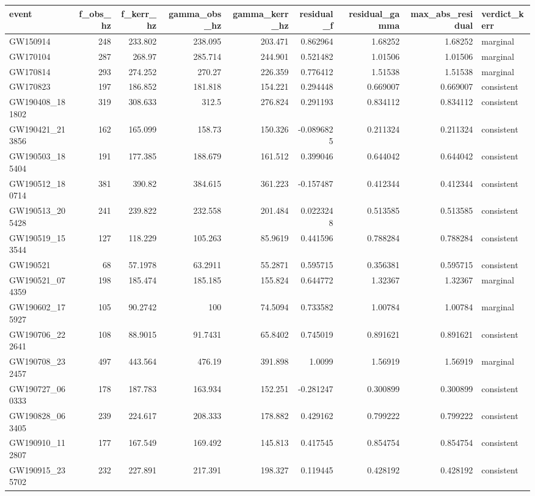 \begin{tabular}{lrrrrrrrl}
\toprule
event & f\_obs\_hz & f\_kerr\_hz & gamma\_obs\_hz & gamma\_kerr\_hz & residual\_f & residual\_gamma & max\_abs\_residual & verdict\_kerr \\
\midrule
GW150914 & 248 & 233.802 & 238.095 & 203.471 & 0.862964 & 1.68252 & 1.68252 & marginal \\
GW170104 & 287 & 268.97 & 285.714 & 244.901 & 0.521482 & 1.01506 & 1.01506 & marginal \\
GW170814 & 293 & 274.252 & 270.27 & 226.359 & 0.776412 & 1.51538 & 1.51538 & marginal \\
GW170823 & 197 & 186.852 & 181.818 & 154.221 & 0.294448 & 0.669007 & 0.669007 & consistent \\
GW190408\_181802 & 319 & 308.633 & 312.5 & 276.824 & 0.291193 & 0.834112 & 0.834112 & consistent \\
GW190421\_213856 & 162 & 165.099 & 158.73 & 150.326 & -0.0896825 & 0.211324 & 0.211324 & consistent \\
GW190503\_185404 & 191 & 177.385 & 188.679 & 161.512 & 0.399046 & 0.644042 & 0.644042 & consistent \\
GW190512\_180714 & 381 & 390.82 & 384.615 & 361.223 & -0.157487 & 0.412344 & 0.412344 & consistent \\
GW190513\_205428 & 241 & 239.822 & 232.558 & 201.484 & 0.0223248 & 0.513585 & 0.513585 & consistent \\
GW190519\_153544 & 127 & 118.229 & 105.263 & 85.9619 & 0.441596 & 0.788284 & 0.788284 & consistent \\
GW190521 & 68 & 57.1978 & 63.2911 & 55.2871 & 0.595715 & 0.356381 & 0.595715 & consistent \\
GW190521\_074359 & 198 & 185.474 & 185.185 & 155.824 & 0.644772 & 1.32367 & 1.32367 & marginal \\
GW190602\_175927 & 105 & 90.2742 & 100 & 74.5094 & 0.733582 & 1.00784 & 1.00784 & marginal \\
GW190706\_222641 & 108 & 88.9015 & 91.7431 & 65.8402 & 0.745019 & 0.891621 & 0.891621 & consistent \\
GW190708\_232457 & 497 & 443.564 & 476.19 & 391.898 & 1.0099 & 1.56919 & 1.56919 & marginal \\
GW190727\_060333 & 178 & 187.783 & 163.934 & 152.251 & -0.281247 & 0.300899 & 0.300899 & consistent \\
GW190828\_063405 & 239 & 224.617 & 208.333 & 178.882 & 0.429162 & 0.799222 & 0.799222 & consistent \\
GW190910\_112807 & 177 & 167.549 & 169.492 & 145.813 & 0.417545 & 0.854754 & 0.854754 & consistent \\
GW190915\_235702 & 232 & 227.891 & 217.391 & 198.327 & 0.119445 & 0.428192 & 0.428192 & consistent \\
\bottomrule
\end{tabular}
